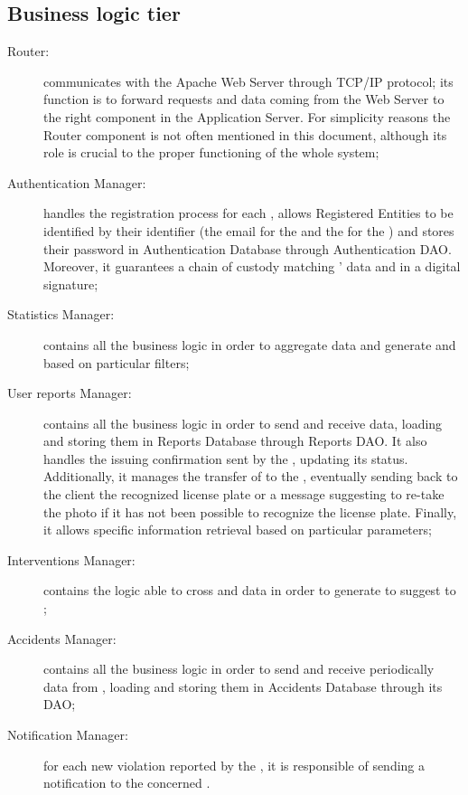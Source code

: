 \documentclass[../../DD.tex]{subfiles}
\begin{document}
\subsection{Business logic tier\label{sect:2.2.3}}
	\begin{description}
	\item[Router:] communicates with the Apache Web Server through TCP/IP protocol; its function is to forward requests and data coming from the Web Server to the right component in the Application Server. For simplicity reasons the Router component is not often mentioned in this document, although its role is crucial to the proper functioning of the whole system;
	 
	\item[Authentication Manager:] handles the registration process for each , allows Registered Entities to be identified by their identifier (the email for the  and the  for the ) and stores their password in Authentication Database through Authentication DAO. Moreover, it guarantees a chain of custody matching ' data and  in a digital signature;
	
	\item[Statistics Manager:] contains all the business logic in order to aggregate  data and generate  and   based on particular filters;
	
	\item[User reports Manager:] contains all the business logic in order to send and receive  data, loading and storing them in Reports Database through Reports DAO. It also handles the  issuing confirmation sent by the , updating its status. Additionally, it manages the transfer of  to the , eventually sending back to the client the recognized license plate or a message suggesting to re-take the photo if it has not been possible to recognize the license plate. Finally, it allows specific  information retrieval based on particular parameters;
	
	\item[Interventions Manager:] contains the logic able to cross  and  data in order to generate  to suggest to ;
	
	\item[Accidents Manager:] contains all the business logic in order to send and receive periodically  data from , loading and storing them in Accidents Database through its DAO;
	
	\item[Notification Manager:] for each new violation reported by the , it is responsible of sending a notification to the concerned .
	\end{description}
\end{document}
